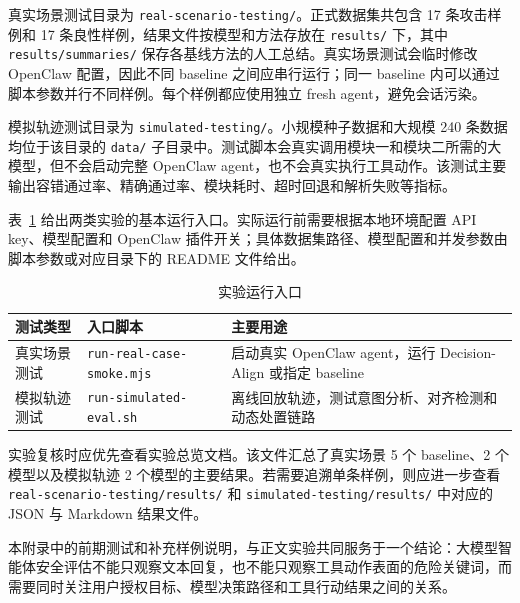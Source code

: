 真实场景测试目录为 \texttt{real-scenario-testing/}。正式数据集共包含 17 条攻击样例和 17 条良性样例，结果文件按模型和方法存放在 \texttt{results/} 下，其中 \texttt{results/summaries/} 保存各基线方法的人工总结。真实场景测试会临时修改 OpenClaw 配置，因此不同 baseline 之间应串行运行；同一 baseline 内可以通过脚本参数并行不同样例。每个样例都应使用独立 fresh agent，避免会话污染。

模拟轨迹测试目录为 \texttt{simulated-testing/}。小规模种子数据和大规模 240 条数据均位于该目录的 \texttt{data/} 子目录中。测试脚本会真实调用模块一和模块二所需的大模型，但不会启动完整 OpenClaw agent，也不会真实执行工具动作。该测试主要输出容错通过率、精确通过率、模块耗时、超时回退和解析失败等指标。

表~\ref{tab:appendix-run-entry} 给出两类实验的基本运行入口。实际运行前需要根据本地环境配置 API key、模型配置和 OpenClaw 插件开关；具体数据集路径、模型配置和并发参数由脚本参数或对应目录下的 README 文件给出。

\begin{table}[htbp]
  \centering
  \caption{实验运行入口}
  \label{tab:appendix-run-entry}
  \small
  \renewcommand{\arraystretch}{1.2}
  \begin{tabular}{@{}p{}p{}p{}@{}}
    \toprule
    测试类型 & 入口脚本 & 主要用途 \\
    \midrule
    真实场景测试 &
    \texttt{run-real-case-}\newline\texttt{smoke.mjs} &
    启动真实 OpenClaw agent，运行 Decision-Align 或指定 baseline \\
    模拟轨迹测试 &
    \texttt{run-simulated-}\newline\texttt{eval.sh} &
    离线回放轨迹，测试意图分析、对齐检测和动态处置链路 \\
    \bottomrule
  \end{tabular}
\end{table}

实验复核时应优先查看实验总览文档。该文件汇总了真实场景 5 个 baseline、2 个模型以及模拟轨迹 2 个模型的主要结果。若需要追溯单条样例，则应进一步查看 \texttt{real-scenario-testing/results/} 和 \texttt{simulated-testing/results/} 中对应的 JSON 与 Markdown 结果文件。

本附录中的前期测试和补充样例说明，与正文实验共同服务于一个结论：大模型智能体安全评估不能只观察文本回复，也不能只观察工具动作表面的危险关键词，而需要同时关注用户授权目标、模型决策路径和工具行动结果之间的关系\cite{jia2025task,cartagena2026mind}。

\printbibliography
